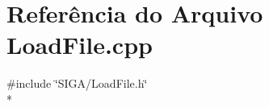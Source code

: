 \section{Referência do Arquivo Load\+File.\+cpp}
\label{_load_file_8cpp}
{\ttfamily \#include \char`\"{}S\+I\+G\+A/\+Load\+File.\+h\char`\"{}}\\*
